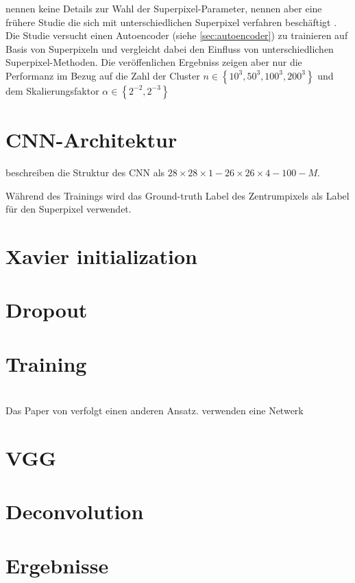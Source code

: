 \citeauthor{ChenConvolutionalNeuralNetworks2017a} nennen keine Details zur Wahl
der Superpixel-Parameter, nennen aber eine frühere Studie die sich mit unterschiedlichen 
Superpixel verfahren beschäftigt \parencite{ChenPageSegmentationHistorical2016}.
Die Studie versucht einen Autoencoder (siehe \ref{sec:autoencoder}) zu trainieren auf Basis von Superpixeln und vergleicht dabei den Einfluss von unterschiedlichen Superpixel-Methoden. Die veröffenlichen Ergebniss zeigen aber nur die Performanz im Bezug
auf die Zahl der Cluster \(n \in \left\{10^3, 50^3, 100^3, 200^3\right\}\) und dem Skalierungsfaktor \(\alpha \in \left\{2^{-2}, 2^{-3}\right\}\)

\section{CNN-Architektur}
\citeauthor{ChenConvolutionalNeuralNetworks2017a} beschreiben die Struktur
des CNN als \(28 \times 28 \times 1 - 26 \times 26 \times 4 - 100 - M\).

Während des Trainings wird das Ground-truth Label des Zentrumpixels als Label für den Superpixel verwendet.


\section{Xavier initialization}


\section{Dropout}



\section{Training}


\section{\textcite{XuPageSegmentationHistorical2017}}
Das Paper  von \citeauthor*{XuPageSegmentationHistorical2017} verfolgt einen anderen Ansatz.
\citeauthor{XuPageSegmentationHistorical2017} verwenden eine Netwerk  


\section{VGG}
\section{Deconvolution}
\section{Ergebnisse}